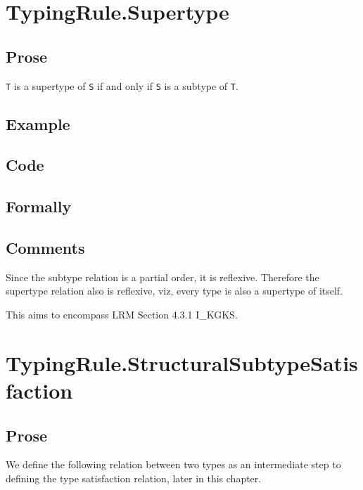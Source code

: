 \documentclass{book}
\begin{document}
\section{TypingRule.Supertype}

  \subsection{Prose}
  \texttt{T} is a supertype of \texttt{S} if and only if \texttt{S} is a subtype of \texttt{T}.
  

  \subsection{Example}

  \subsection{Code}

\begin{emptyformal}
  \subsection{Formally}
\end{emptyformal}

\subsection{Comments}
  Since the subtype relation is a partial order, it is reflexive. Therefore the
  supertype relation also is reflexive, viz, every type is also a supertype of
  itself.

  This aims to encompass LRM Section 4.3.1 I\_KGKS.

\section{TypingRule.StructuralSubtypeSatisfaction}

\subsection{Prose}
We define the following relation between two types as an intermediate step to defining the type satisfaction relation, later in this chapter.
\end{document}
